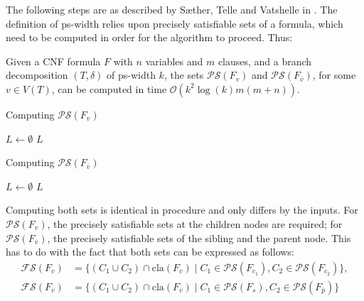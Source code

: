 The following steps are as described by S\ae ther, Telle and Vatshelle in \cite{DBLP:conf/sat/SaetherTV14}.
The definition of ps-width relies upon precisely satisfiable sets of a formula, which need to be computed in order for the algorithm to proceed.
Thus:

\begin{lemma}
	Given a CNF formula $F$ with $n$ variables and $m$ clauses, and a branch decomposition $(T, \delta)$ of ps-width $k$, the sets $\mathcal{PS}(F_v)$ and $\mathcal{PS}(F_{\overline{v}})$, for some $v \in V(T)$, can be computed in time $\mathcal{O}(k^2 \log(k) m(m+n))$.
\end{lemma}

\begin{algorithm}
	\LinesNumbered
	\caption{Computing $\mathcal{PS}(F_v)$ \cite{DBLP:conf/sat/SaetherTV14}}
	\label{alg:ps-f-v}
	

	$L \gets \emptyset$\;
	\Return $L$
\end{algorithm}

\begin{algorithm}
	\LinesNumbered
	\caption{Computing $\mathcal{PS}(F_{\overline{v}})$ \cite{DBLP:conf/sat/SaetherTV14}}
	\label{alg:ps-f-negv}
	

	$L \gets \emptyset$\;
	\Return $L$
\end{algorithm}

Computing both sets is identical in procedure and only differs by the inputs.
For $\mathcal{PS}(F_v)$, the precisely satisfiable sets at the children nodes are required; for $\mathcal{PS}(F_{\overline{v}})$, the precisely satisfiable sets of the sibling and the parent node.
This has to do with the fact that both sets can be expressed as follows:
\begin{align*}
	\mathcal{FS}(F_v) &= \{ (C_1 \cup C_2) \cap \text{cla}(F_v) \; | \; C_1 \in \mathcal{PS}(F_{c_1}), C_2 \in \mathcal{PS}(F_{c_2}) \},\\
	\mathcal{FS}(F_{\overline{v}}) &= \{ (C_1 \cup C_2) \cap \text{cla}(F_{\overline{v}}) \; | \; C_1 \in \mathcal{PS}(F_s), C_2 \in \mathcal{PS}(F_{\overline{p}}) \}
\end{align*}

